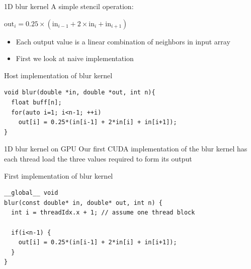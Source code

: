 \documentclass[aspectratio=43]{beamer}
\begin{document}
\begin{frame}[fragile]{1D blur kernel}
    A simple stencil operation:

    \centering $\text{out}_i = 0.25\times(\text{in}_{i-1}+2\times\text{in}_i+\text{in}_{i+1})$
    \smallskip

    \begin{itemize}
        \item Each output value is a linear combination of neighbors in input array
        \item First we look at naive implementation
    \end{itemize}

    \begin{code}{Host implementation of blur kernel}
        \begin{lstlisting}[style=boxcudatiny]
void blur(double *in, double *out, int n){
  float buff[n];
  for(auto i=1; i<n-1; ++i)
    out[i] = 0.25*(in[i-1] + 2*in[i] + in[i+1]);
}
        \end{lstlisting}
    \end{code}

\end{frame}

\begin{frame}[fragile]{1D blur kernel on GPU}
    Our first CUDA implementation of the blur kernel has each thread load the three values required to form its output\\
    
    \begin{code}{First implementation of blur kernel}
        \begin{lstlisting}[style=boxcudatiny]
__global__ void
blur(const double* in, double* out, int n) {
  int i = threadIdx.x + 1; // assume one thread block

  if(i<n-1) {
    out[i] = 0.25*(in[i-1] + 2*in[i] + in[i+1]);
  }
}
        \end{lstlisting}
    \end{code}

\end{frame}
\end{document}
